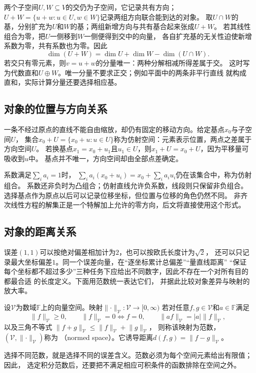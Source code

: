 两个子空间$U,W\subseteq V$的交仍为子空间，它记录共有方向；
$U+W=\{u+w:u\in U,w\in W\}$记录两组方向联合能到达的对象。
取$U\cap W$的基，分别扩充为$U$和$W$的基；两组新增方向与共有基合起来张成$U+W$。
若其线性组合为零，把$U$一侧移到$W$一侧便得到交中的向量，
各自扩充基的无关性迫使新增系数为零，共有系数也为零。因此
\[
 \dim(U+W)=\dim U+\dim W-\dim(U\cap W).
\]
若交只有零元素，则$v=u+w$的分量唯一：两种分解相减所得差属于交。
这时写为代数直和$U\oplus W$。唯一分量不要求正交；例如平面中的两条非平行直线
就构成直和，实际计算分量还要选择相应基。

\subsection{对象的位置与方向关系}
\label{sec:linear-algebra-affine-relations}

一条不经过原点的直线不能自由缩放，却仍有固定的移动方向。给定基点$x_0$与子空间$U$，
集合$x_0+U=\{x_0+u:u\in U\}$称为仿射空间：元素表示位置，两点之差属于方向空间$U$。
若换基点$x_1=x_0+u_1$且$u_1\in U$，则$x_1+U=x_0+U$，因为平移量可吸收到$u$中。
基点并不唯一，方向空间却由全部点差确定。

系数满足$\sum_i a_i=1$时，
$\sum_i a_i(x_0+u_i)=x_0+\sum_i a_i u_i$仍在该集合中，称为仿射组合。
系数还非负时为凸组合；仿射直线允许负系数，线段则只保留非负组合。
选择基点作为原点以后可以记录位移坐标，但位置与位移的角色仍然不同。
非齐次线性方程的解集正是一个特解加上允许的零方向，后文将直接使用这个形式。

\subsection{对象的距离关系}
\label{sec:linear-algebra-distance-relations}
\label{sec:ch06-map-comparison}
\label{sec:matrix-analysis-norms-effective-rank}

误差$(1,1)$可以按绝对偏差相加计为$2$，也可以按欧氏长度计为$\sqrt2$，
还可以只记录最大坐标偏差$1$。同一个误差向量，在“逐坐标累计总偏差”“量直线距离”
“保证每个坐标都不超过多少”三种任务下应给出不同数字，因此不存在一个对所有目的都最合适
的长度定义。下面用范数统一表达它们，
并据此比较对象差异与映射的放大率。
\begin{definition}[赋范空间]
\label{def:functional-normed-space}
设$\mathcal V$为数域$\mathbb F$上的向量空间。映射$\lVert\cdot\rVert_{\mathcal V}:\mathcal V\to[0,\infty)$
若对任意$f,g\in\mathcal V$和$a\in\mathbb F$满足
\[
  \lVert f\rVert_{\mathcal{V}}\geq0,\qquad
  \lVert f\rVert_{\mathcal{V}}=0\Longleftrightarrow f=0,\qquad
  \lVert af\rVert_{\mathcal{V}}=|a|\lVert f\rVert_{\mathcal{V}},
\]
以及三角不等式
$\lVert f+g\rVert_{\mathcal{V}}\leq
\lVert f\rVert_{\mathcal{V}}+\lVert g\rVert_{\mathcal{V}}$，
则称该映射为范数，$(\mathcal V,\lVert\cdot\rVert_{\mathcal V})$称为
（normed space）。它诱导距离$d(f,g)=\lVert f-g\rVert_{\mathcal V}$。
\end{definition}
选择不同范数，就是选择不同的误差含义。范数必须为每个空间元素给出有限值；因此，
选定积分范数后，还要把不满足相应可积条件的函数排除在空间之外。


